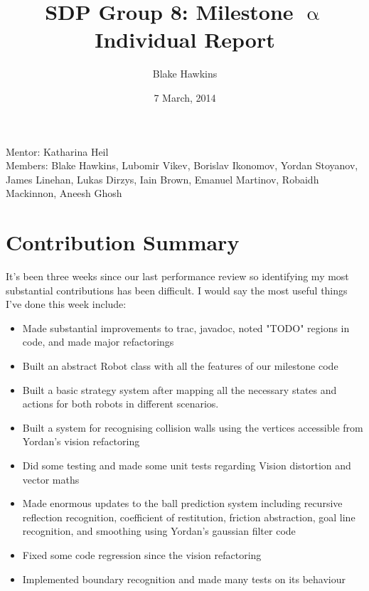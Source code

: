 \documentclass[a4paper,11pt]{article}
\title{SDP Group 8: Milestone $\upalpha$ Individual Report} %
\author{Blake Hawkins} %
\date{7 March, 2014} %
\begin{document}
\maketitle %

\begin{center}
Mentor: Katharina Heil %
\\
Members: Blake Hawkins, %
Lubomir Vikev,
Borislav Ikonomov,
Yordan Stoyanov,
James Linehan,
Lukas Dirzys,
Iain Brown,
Emanuel Martinov,
Robaidh Mackinnon,
Aneesh Ghosh

\end{center}


\section{Contribution Summary}

It's been three weeks since our last performance review so identifying my most substantial contributions has been difficult. I would say the most useful things I've done this week include:

\begin{itemize}
	\item Made substantial improvements to trac, javadoc, noted "TODO" regions in code, and made major refactorings
	\item Built an abstract Robot class with all the features of our milestone code
	\item Built a basic strategy system after mapping all the necessary states and actions for both robots in different scenarios.
	\item Built a system for recognising collision walls using the vertices accessible from Yordan's vision refactoring
	\item Did some testing and made some unit tests regarding Vision distortion and vector maths
	\item Made enormous updates to the ball prediction system including recursive reflection recognition, coefficient of restitution, friction abstraction, goal line recognition, and smoothing using Yordan's gaussian filter code
	\item Fixed some code regression since the vision refactoring
	\item Implemented boundary recognition and made many tests on its behaviour
\end{itemize}
\end{document}
